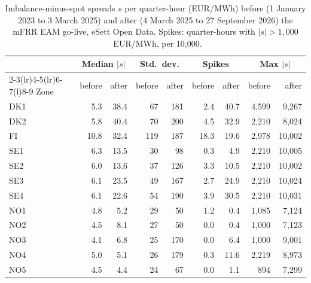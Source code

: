\begin{table}[!htbp]
\centering
\caption{Imbalance-minus-spot spreads $s$ per quarter-hour (EUR/MWh) before (1 January 2023 to 3 March 2025) and after (4 March 2025 to 27 September 2026) the mFRR EAM go-live, eSett Open Data. Spikes: quarter-hours with $|s|>1{,}000$~EUR/MWh, per 10,000.}
\label{tab:tails12}
\scriptsize
\begin{tabular}{@{}lrrrrrrrr@{}}
\toprule
& \multicolumn{2}{c}{Median $|s|$} & \multicolumn{2}{c}{Std.~dev.} & \multicolumn{2}{c}{Spikes} & \multicolumn{2}{c}{Max $|s|$} \\
\cmidrule(lr){2-3}\cmidrule(lr){4-5}\cmidrule(lr){6-7}\cmidrule(l){8-9}
Zone & before & after & before & after & before & after & before & after \\
\midrule
DK1 & 5.3 & 38.4 & 67 & 181 & 2.4 & 40.7 & 4,599 & 9,267 \\
DK2 & 5.8 & 40.4 & 70 & 200 & 4.5 & 32.9 & 2,210 & 8,024 \\
FI & 10.8 & 32.4 & 119 & 187 & 18.3 & 19.6 & 2,978 & 10,002 \\
SE1 & 6.3 & 13.5 & 30 & 98 & 0.3 & 4.9 & 2,210 & 10,005 \\
SE2 & 6.0 & 13.6 & 37 & 126 & 3.3 & 10.5 & 2,210 & 10,002 \\
SE3 & 6.1 & 23.5 & 49 & 167 & 2.7 & 24.9 & 2,210 & 10,024 \\
SE4 & 6.1 & 22.6 & 54 & 190 & 3.9 & 30.5 & 2,210 & 10,031 \\
NO1 & 4.8 & 5.2 & 29 & 50 & 1.2 & 0.4 & 1,085 & 7,124 \\
NO2 & 4.5 & 8.1 & 27 & 50 & 0.0 & 0.4 & 1,000 & 7,123 \\
NO3 & 4.1 & 6.8 & 25 & 170 & 0.0 & 6.4 & 1,000 & 9,001 \\
NO4 & 5.0 & 5.1 & 26 & 179 & 0.3 & 11.6 & 2,219 & 8,973 \\
NO5 & 4.5 & 4.4 & 24 & 67 & 0.0 & 1.1 & 894 & 7,299 \\
\bottomrule
\end{tabular}
\end{table}
